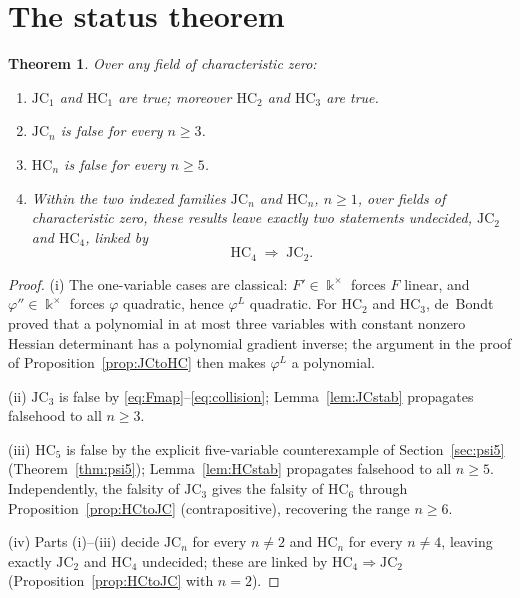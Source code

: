 \documentclass[11pt]{article}
\theoremstyle{plain}
\newtheorem{theorem}{Theorem}[section]
\theoremstyle{definition}
\newcommand{\kk}{\Bbbk}
\newcommand{\JC}{\mathrm{JC}}
\newcommand{\HC}{\mathrm{HC}}
\begin{document}
\section{The status theorem}

\begin{theorem}\label{thm:status}
Over any field of characteristic zero:
\begin{enumerate}
\item[\(\mathrm{(i)}\)] $\JC_1$ and $\HC_1$ are true; moreover $\HC_2$
and $\HC_3$ are true.
\item[\(\mathrm{(ii)}\)] $\JC_n$ is false for every $n\ge3$.
\item[\(\mathrm{(iii)}\)] $\HC_n$ is false for every $n\ge5$.
\item[\(\mathrm{(iv)}\)] Within the two indexed families $\JC_n$ and
$\HC_n$, $n\ge1$, over fields of characteristic zero, these results
leave exactly two statements undecided, $\JC_2$ and $\HC_4$, linked by
\[
\HC_4 \;\Longrightarrow\; \JC_2 .
\]
\end{enumerate}
\end{theorem}

\begin{proof}
(i) The one-variable cases are classical: $F'\in\kk^{\times}$ forces
$F$ linear, and $\varphi''\in\kk^{\times}$ forces $\varphi$ quadratic,
hence $\varphi^{L}$ quadratic. For $\HC_2$ and $\HC_3$, de~Bondt
\cite{deBondt2012} proved that a polynomial in at most three variables
with constant nonzero Hessian determinant has a polynomial gradient
inverse; the argument in the proof of Proposition~\ref{prop:JCtoHC} then
makes $\varphi^{L}$ a polynomial.

(ii) $\JC_3$ is false by \eqref{eq:Fmap}--\eqref{eq:collision};
Lemma~\ref{lem:JCstab} propagates falsehood to all $n\ge3$.

(iii) $\HC_5$ is false by the explicit five-variable counterexample of
Section~\ref{sec:psi5} (Theorem~\ref{thm:psi5}); Lemma~\ref{lem:HCstab}
propagates falsehood to all $n\ge5$. Independently, the falsity of
$\JC_3$ gives the falsity of $\HC_6$ through
Proposition~\ref{prop:HCtoJC} (contrapositive), recovering the range
$n\ge6$.

(iv) Parts (i)--(iii) decide $\JC_n$ for every $n\ne2$ and $\HC_n$ for
every $n\ne4$, leaving exactly $\JC_2$ and $\HC_4$ undecided; these are
linked by $\HC_4\Rightarrow\JC_2$ (Proposition~\ref{prop:HCtoJC} with
$n=2$).
\end{proof}
\end{document}
